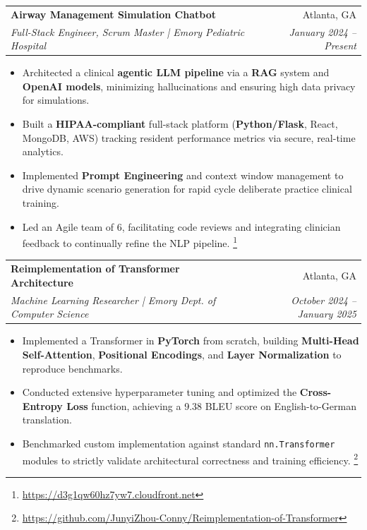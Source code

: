 \documentclass[a4paper,10pt]{article}
\makeatletter
\newcommand{\resumeSubheading}[4]{
  \vspace{-1pt}\item
    \begin{tabular*}{0.97\textwidth}{l@{\extracolsep{\fill}}r}
      \textbf{#1} & #2 \\
      \textit{#3} & \textit{#4} \\
    \end{tabular*}\vspace{-5pt}
}
\newcommand{\resumeItemListStart}{\begin{itemize}}
\newcommand{\resumeItemListEnd}{\end{itemize}\vspace{-6pt}}
\makeatother
\begin{document}
  \resumeSubheading
    {Airway Management Simulation Chatbot}{Atlanta, GA}
    {Full-Stack Engineer, Scrum Master | Emory Pediatric Hospital}{January 2024 -- Present}
    \resumeItemListStart
      \item Architected a clinical \textbf{agentic LLM pipeline} via a \textbf{RAG} system and \textbf{OpenAI models}, minimizing hallucinations and ensuring high data privacy for simulations.
      \item Built a \textbf{HIPAA-compliant} full-stack platform (\textbf{Python/Flask}, React, MongoDB, AWS) tracking resident performance metrics via secure, real-time analytics.
      \item Implemented \textbf{Prompt Engineering} and context window management to drive dynamic scenario generation for rapid cycle deliberate practice clinical training.
      \item Led an Agile team of 6, facilitating code reviews and integrating clinician feedback to continually refine the NLP pipeline. \footnote{\url{https://d3g1qw60hz7yw7.cloudfront.net}}
    \resumeItemListEnd

  \resumeSubheading
    {Reimplementation of Transformer Architecture}{Atlanta, GA}
    {Machine Learning Researcher | Emory Dept. of Computer Science}{October 2024 -- January 2025}
    \resumeItemListStart
      \item Implemented a Transformer in \textbf{PyTorch} from scratch, building \textbf{Multi-Head Self-Attention}, \textbf{Positional Encodings}, and \textbf{Layer Normalization} to reproduce benchmarks.
      \item Conducted extensive hyperparameter tuning and optimized the \textbf{Cross-Entropy Loss} function, achieving a 9.38 BLEU score on English-to-German translation.
      \item Benchmarked custom implementation against standard \texttt{nn.Transformer} modules to strictly validate architectural correctness and training efficiency. \footnote{\url{https://github.com/JunyiZhou-Conny/Reimplementation-of-Transformer}}
    \resumeItemListEnd
\end{document}
